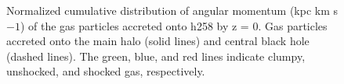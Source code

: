 \documentclass[]{emulateapj}
\begin{document}
\begin{figure}
\centerline{}
\caption[]{ Normalized cumulative distribution of angular momentum (kpc km s${{-1}}$) of the gas particles accreted onto h258 by z = 0.  Gas particles accreted onto the main halo (solid lines) and central black hole (dashed lines). The green, blue, and red lines indicate clumpy, unshocked, and shocked gas, respectively.}
\label{hrh258angmom} 
\end{figure}
\end{document}
